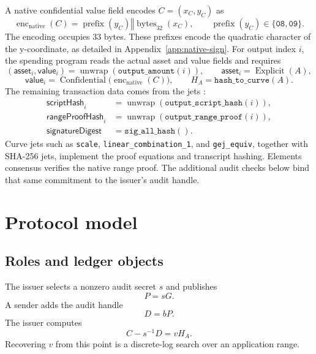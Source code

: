 \documentclass[11pt]{article}
\begin{document}
    A native confidential value field encodes $C=(x_C,y_C)$ as
    \[
        \operatorname{enc}_{\mathrm{native}}(C)
        =\operatorname{prefix}(y_C)\mathbin\Vert\operatorname{bytes}_{32}(x_C),
        \qquad \operatorname{prefix}(y_C)\in\{\texttt{08},\texttt{09}\}.
    \]
    The encoding occupies 33 bytes.
    These prefixes encode the quadratic character of the y-coordinate, as detailed in Appendix~\ref{app:native-sign}.
    For output index $i$, the spending program reads the actual asset and value fields and requires
    \[
        (\mathsf{asset}_i,\mathsf{value}_i)
        =\operatorname{unwrap}(\texttt{output\_amount}(i)),
        \qquad \mathsf{asset}_i=\operatorname{Explicit}(A),
    \]
    \[
        \mathsf{value}_i=\operatorname{Confidential}\bigl(\operatorname{enc}_{\mathrm{native}}(C)\bigr),
        \qquad H_A=\texttt{hash\_to\_curve}(A).
    \]
    The remaining transaction data comes from the jets \cite{simplicity-jets}:
    \[
        \begin{aligned}
            \mathsf{scriptHash}_i&=\operatorname{unwrap}(\texttt{output\_script\_hash}(i)),\\
            \mathsf{rangeProofHash}_i&=\operatorname{unwrap}(\texttt{output\_range\_proof}(i)),\\
            \mathsf{signatureDigest}&=\texttt{sig\_all\_hash}().
        \end{aligned}
    \]
    Curve jets such as \texttt{scale}, \texttt{linear\_combination\_1}, and \texttt{gej\_equiv}, together with SHA-256 jets, implement the proof equations and transcript hashing.
    Elements consensus verifies the native range proof. The additional audit checks below bind that same commitment to the issuer's audit handle.


    \section{Protocol model}
    \label{sec:model}

    \subsection{Roles and ledger objects}

    The issuer selects a nonzero audit secret $s$ and publishes
    \begin{equation}
        P=sG.
        \label{eq:audit-key}
    \end{equation}
    A sender adds the audit handle
    \begin{equation}
        D=bP.
        \label{eq:handle}
    \end{equation}
    The issuer computes
    \begin{equation}
        C-s^{-1}D=vH_A.
        \label{eq:recovery-target}
    \end{equation}
    Recovering $v$ from this point is a discrete-log search over an application range.
\end{document}
